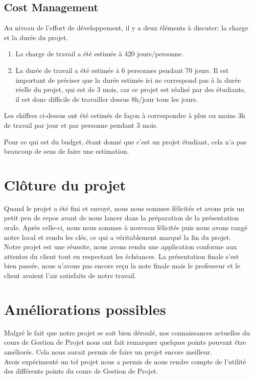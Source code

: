 \documentclass[t, 12pt, usenames,dvipsnames]{article}
\begin{document}
        \subsection{Cost Management}
            \noindent Au niveau de l'effort de développement, il y a deux éléments à discuter: la charge et la durée du projet.
            \begin{enumerate}
                \item La charge de travail a été estimée à 420 jours/personne.
                \item La durée de travail a été estimée à 6 personnes pendant 70 jours. Il est important de préciser que la durée estimée ici ne correspond pas à la durée réelle du projet, qui est de 3 mois, car ce projet est réalisé par des étudiants, il est donc difficile de travailler dessus 8h/jour tous les jours.
            \end{enumerate}
            Les chiffres ci-dessus ont été estimés de façon à correspondre à plus ou moins 3h de travail par jour et par personne pendant 3 mois.
            
            Pour ce qui est du budget, étant donné que c'est un projet étudiant, cela n'a pas beaucoup de sens de faire une estimation.
    
    \section{Clôture du projet}
        \noindent Quand le projet a été fini et envoyé, nous nous sommes félicités et avons pris un petit peu de repos avant de nous lancer dans la préparation de la présentation orale. Après celle-ci, nous nous sommes à nouveau félicités puis nous avons rangé notre local et rendu les clés, ce qui a véritablement marqué la fin du projet.\\
        Notre projet est une réussite, nous avons rendu une application conforme aux attentes du client tout en respectant les échéances. La présentation finale s'est bien passée, nous n'avons pas encore reçu la note finale mais le professeur et le client avaient l'air satisfaits de notre travail.\\
        
    \newpage
    
     \section{Améliorations possibles}
     \noindent Malgré le fait que notre projet se soit bien déroulé, nos connaissances actuelles du cours de Gestion de Projet nous ont fait remarquer quelques points pouvant être améliorés. Cela nous aurait permis de faire un projet encore meilleur. \\
     Avoir expérimenté un tel projet nous a permis de nous rendre compte de l'utilité des différents points du cours de Gestion de Projet.
     
\end{document}
